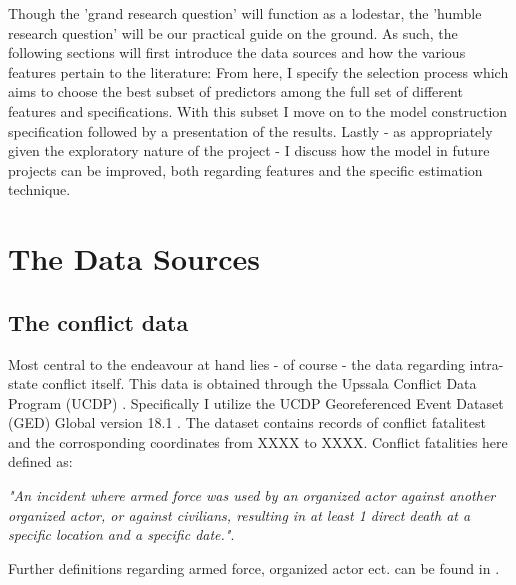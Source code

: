 \documentclass[a4paper]{article}
\begin{document}
Though the 'grand research question' will function as a lodestar, the 'humble research question' will be our practical guide on the ground. As such, the following sections will first introduce the data sources and how the various features pertain to the literature: From here, I specify the selection process which aims to choose the best subset of predictors among the full set of different features and specifications. With this subset I move on to the model construction specification followed by a presentation of the results. Lastly - as appropriately given the exploratory nature of the project - I discuss how the model in future projects can be improved, both regarding features and the specific estimation technique.\par




\section{The Data Sources} %


\subsection{The conflict data}

Most central to the endeavour at hand lies - of course - the data regarding intra-state conflict itself. This data is obtained through the Upssala Conflict Data Program (UCDP) \citep{Sundberg_2013, Croicu_Sundberg_2017}. Specifically I utilize the UCDP Georeferenced Event Dataset (GED) Global version 18.1 \citep{UCDP_2017}. The dataset contains records of conflict fatalitest and the corrosponding coordinates from XXXX to XXXX. Conflict fatalities here defined as: 

\begin{displayquote}

\emph{"An incident where armed force was used by an organized actor against another organized actor, or against civilians, resulting in at least 1 direct death at a specific location and a specific date."}\citep[38]{Croicu_Sundberg_2017}.

\end{displayquote}

Further definitions regarding armed force, organized actor ect. can be found in \cite[10-11]{Croicu_Sundberg_2017}.\par 
\end{document}
